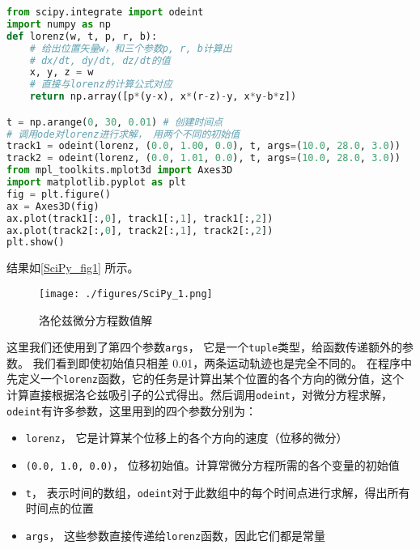 \begin{lstlisting}[language=python]
from scipy.integrate import odeint
import numpy as np
def lorenz(w, t, p, r, b):
    # 给出位置矢量w，和三个参数p, r, b计算出
    # dx/dt, dy/dt, dz/dt的值
    x, y, z = w
    # 直接与lorenz的计算公式对应
    return np.array([p*(y-x), x*(r-z)-y, x*y-b*z])

t = np.arange(0, 30, 0.01) # 创建时间点
# 调用ode对lorenz进行求解， 用两个不同的初始值
track1 = odeint(lorenz, (0.0, 1.00, 0.0), t, args=(10.0, 28.0, 3.0))
track2 = odeint(lorenz, (0.0, 1.01, 0.0), t, args=(10.0, 28.0, 3.0))
from mpl_toolkits.mplot3d import Axes3D
import matplotlib.pyplot as plt
fig = plt.figure()
ax = Axes3D(fig)
ax.plot(track1[:,0], track1[:,1], track1[:,2])
ax.plot(track2[:,0], track2[:,1], track2[:,2])
plt.show()
\end{lstlisting}
结果如\autoref{SciPy_fig1} 所示。
\begin{figure}[ht]
\centering
\texttt{[image: ./figures/SciPy\_1.png]}
\caption{洛伦兹微分方程数值解} \label{SciPy_fig1}
\end{figure}
这里我们还使用到了第四个参数\verb|args|， 它是一个\verb|tuple|类型，给函数传递额外的参数。 我们看到即使初始值只相差 0.01，两条运动轨迹也是完全不同的。
在程序中先定义一个\verb|lorenz|函数，它的任务是计算出某个位置的各个方向的微分值，这个计算直接根据洛仑兹吸引子的公式得出。然后调用\verb|odeint|，对微分方程求解，\verb|odeint|有许多参数，这里用到的四个参数分别为：
\begin{itemize}
\item \verb|lorenz|， 它是计算某个位移上的各个方向的速度（位移的微分）
\item \verb|(0.0, 1.0, 0.0)|， 位移初始值。计算常微分方程所需的各个变量的初始值
\item \verb|t|， 表示时间的数组，\verb|odeint|对于此数组中的每个时间点进行求解，得出所有时间点的位置
\item \verb|args|， 这些参数直接传递给\verb|lorenz|函数，因此它们都是常量
\end{itemize}
